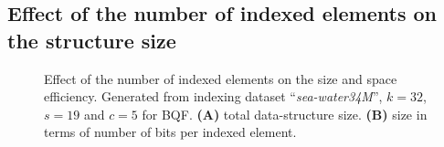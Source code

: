 \subsection{Effect of the number of indexed elements on the structure size}
\begin{figure}[ht]
\centering
    \caption{Effect of the number of indexed elements on the size and space efficiency. Generated from indexing dataset ``\textit{sea-water34M}'', $k=32$, $s=19$ and $c=5$ for BQF. \textbf{(A)} total data-structure size. \textbf{(B)} size in terms of number of bits per indexed element.}
    \label{fig:size}
\end{figure}


